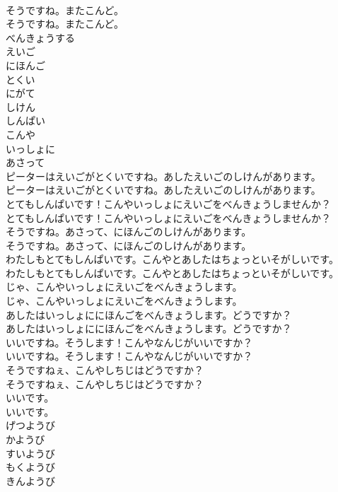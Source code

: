 \documentclass[8pt]{extreport}
\begin{document}
\begin{CJK}{UTF8}{min}
\\	そうですね。またこんど。	
\\	そうですね。またこんど。 
\\	べんきょうする
\\	えいご
\\	にほんご
\\	とくい
\\	にがて
\\	しけん
\\	しんぱい
\\	こんや
\\	いっしょに
\\	あさって
\\	ピーターはえいごがとくいですね。あしたえいごのしけんがあります。	
\\	ピーターはえいごがとくいですね。あしたえいごのしけんがあります。 
\\	とてもしんぱいです！こんやいっしょにえいごをべんきょうしませんか？	
\\	とてもしんぱいです！こんやいっしょにえいごをべんきょうしませんか？ 
\\	そうですね。あさって、にほんごのしけんがあります。	
\\	そうですね。あさって、にほんごのしけんがあります。 
\\	わたしもとてもしんぱいです。こんやとあしたはちょっといそがしいです。	
\\	わたしもとてもしんぱいです。こんやとあしたはちょっといそがしいです。 
\\	じゃ、こんやいっしょにえいごをべんきょうします。	
\\	じゃ、こんやいっしょにえいごをべんきょうします。 
\\	あしたはいっしょににほんごをべんきょうします。どうですか？	
\\	あしたはいっしょににほんごをべんきょうします。どうですか？ 
\\	いいですね。そうします！こんやなんじがいいですか？	
\\	いいですね。そうします！こんやなんじがいいですか？ 
\\	そうですねぇ、こんやしちじはどうですか？	
\\	そうですねぇ、こんやしちじはどうですか？ 
\\	いいです。	
\\	いいです。 
\\	げつようび
\\	かようび
\\	すいようび
\\	もくようび
\\	きんようび

\end{CJK}
\end{document}
